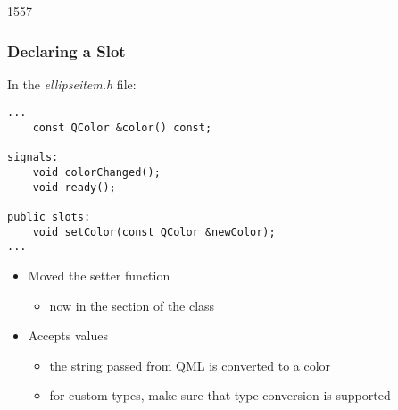 \begin{slide}[fragile]{1557}\frametitle{Declaring a Slot}

In the \textit{ellipseitem.h} file:

\vspace*{0.25em}
\begin{lstlisting}
...
    const QColor &color() const;

signals:
    void colorChanged();
    void ready();

public slots:
    void setColor(const QColor &newColor);
...
\end{lstlisting}

\begin{itemize}
\item Moved the  setter function
  \begin{itemize}
  \item now in the  section of the class
  \end{itemize}
\vspace*{0.25em}
\item Accepts  values
  \begin{itemize}
  \item the string passed from QML is converted to a color
  \item for custom types, make sure that type conversion is supported
  \end{itemize}
\end{itemize}

\end{slide}

